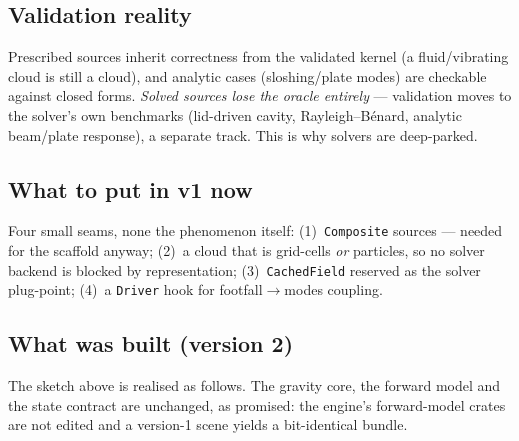 \documentclass[11pt,a4paper]{article}
\theoremstyle{reqstyle}
\begin{document}
\subsection{Validation reality}
\label{sec:parked-val}
Prescribed sources inherit correctness from the validated kernel (a fluid/vibrating cloud is
still a cloud), and analytic cases (sloshing/plate modes) are checkable against closed
forms. \emph{Solved sources lose the oracle entirely} --- validation moves to the solver's
own benchmarks (lid-driven cavity, Rayleigh--B\'enard, analytic beam/plate response), a
separate track. This is why solvers are deep-parked.

\subsection{What to put in v1 now}
Four small seams, none the phenomenon itself: (1)~\texttt{Composite} sources --- needed for
the scaffold anyway; (2)~a cloud that is grid-cells \emph{or} particles, so no solver backend
is blocked by representation; (3)~\texttt{CachedField} reserved as the solver plug-point;
(4)~a \texttt{Driver} hook for footfall$\to$modes coupling.

\subsection{What was built (version 2)}
\label{sec:parked-built}
The sketch above is realised as follows. The gravity core, the forward model and the state
contract are unchanged, as promised: the engine's forward-model crates are not edited and a
version-1 scene yields a bit-identical bundle.
\end{document}
